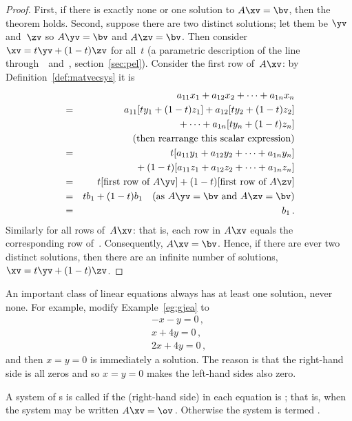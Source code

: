 \begin{proof} 
First, if there is exactly none or one solution to \(A\xv=\bv\), then the theorem holds. 
Second, suppose there are two distinct solutions; let them be \(\yv\) and~\(\zv\) so \(A\yv=\bv\) and \(A\zv=\bv\).  
Then consider \(\xv=t\yv+(1-t)\zv\) for all~\(t\) (a parametric description of the line through~\yv\ and~\zv, section~\ref{sec:pel}). 
Consider the first row of~\(A\xv\): by Definition~\ref{def:matvecsys} it is
\begin{eqnarray*}&&
a_{11}x_1+a_{12}x_2+\cdots+a_{1n}x_n
\\&=&a_{11}[ty_1+(1-t)z_1]+a_{12}[ty_2+(1-t)z_2]
\\&&{}
+\cdots+a_{1n}[ty_n+(1-t)z_n]
\\&&\quad(\text{then rearrange this scalar expression})
\\&=&t[a_{11}y_1+a_{12}y_2+\cdots+a_{1n}y_n]
\\&&{}
+(1-t)[a_{11}z_1+a_{12}z_2+\cdots+a_{1n}z_n]
\\&=&t[\text{first row of }A\yv]
+(1-t)[\text{first row of }A\zv]
\\&=&tb_1+(1-t)b_1 \quad(\text{as }A\yv=\bv\text{ and }A\zv=\bv)
\\&=&b_1\,.
\end{eqnarray*}
Similarly for all rows of~\(A\xv\): that is, each row in \(A\xv\) equals the corresponding row of~\bv.
Consequently, \(A\xv=\bv\). 
Hence, if there are ever two distinct solutions, then there are an infinite number of solutions, \(\xv=t\yv+(1-t)\zv\).
\end{proof}




An important class of linear equations always has at least one solution, never none.
For example, modify Example~\ref{eg:gjea} to 
\begin{equation*}
\begin{array}{l}
-x-y=0\,,\\x+4y=0\,,\\2x+4y=0\,,
\end{array}
\end{equation*}
and then \(x=y=0\) is immediately a solution.  
The reason is that the right-hand side is all zeros and so \(x=y=0\) makes the left-hand sides also zero.

\begin{definition} \label{def:homosys} 
A system of s is called  if the (right-hand side)  in each equation is ; that is, when the system may be written \(A\xv=\ov\)\,.
Otherwise the system is termed .
\end{definition}

